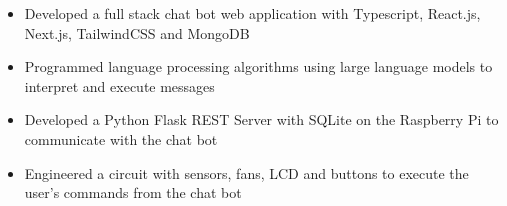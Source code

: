 \documentclass[11pt,a4paper,ragged2e]{altacv}
\begin{document}
\begin{paracol}{1}
\begin{itemize}
  \item Developed a full stack chat bot web application with Typescript, React.js, Next.js, TailwindCSS and MongoDB
  \item Programmed language processing algorithms using large language models to interpret and execute messages 
  \item Developed a Python Flask REST Server with SQLite on the Raspberry Pi to communicate with the chat bot
  \item Engineered a circuit with sensors, fans, LCD and buttons to execute the user's commands from the chat bot 
  \end{itemize}
























\end{paracol}
\end{document}
